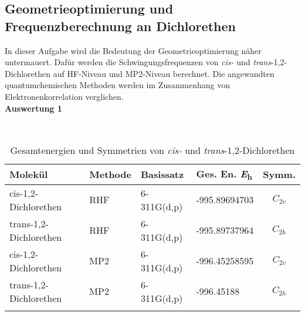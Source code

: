 \documentclass[12pt]{article}
\begin{document}
\begin{onehalfspace}

\section{Geometrieoptimierung und Frequenzberechnung an Dichlorethen}
In dieser Aufgabe wird die Bedeutung der Geometrieoptimierung näher untermauert.
Dafür werden die Schwingungsfrequenzen von \textit{cis-} und \textit{trans}-1,2-Dichlorethen auf HF-Niveau und MP2-Niveau berechnet.
Die angewandten quantumchemischen Methoden werden im Zusammenhang von Elektronenkorrelation verglichen.\\
\textbf{Auswertung 1 }
\begin{figure}[!hptb]
    \caption{Die optimierten Geometrien}
    \begin{subfigure}[b]{0.4\textwidth}
    \end{subfigure}
    ~ %
    \begin{subfigure}[b]{0.4\textwidth}
    \end{subfigure}
    \label{figure:opt}
\end{figure}


\begin{table}[!htpb]

\caption{Gesamtenergien und Symmetrien von \textit{cis-} und \textit{trans}-1,2-Dichlorethen}
\begin{tabular}{llllc}
\toprule
Molekül & Methode &   Basissatz & Ges. En. \si{\hartree} & Symm. \\
\midrule
cis-1,2-Dichlorethen   & RHF& 6-311G(d,p)& -995.89694703 &$C_ {2v}$  \\
trans-1,2-Dichlorethen & RHF& 6-311G(d,p)& -995.89737964 &$C_ {2h}$ \\
cis-1,2-Dichlorethen   & MP2& 6-311G(d,p)& -996.45258595  &$C_ {2v}$  \\
trans-1,2-Dichlorethen & MP2& 6-311G(d,p)& -996.45188 &$C_ {2h}$    \\
\bottomrule
\label{table:energie}
\end{tabular}
\end{table}






\end{onehalfspace}
\end{document}
